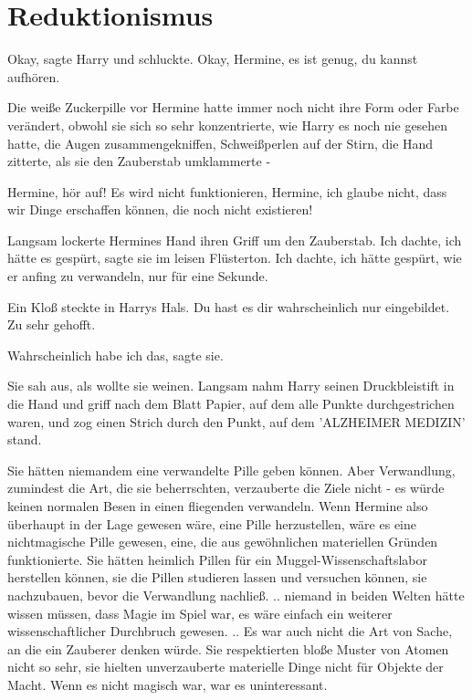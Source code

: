 \chapter{Reduktionismus}

\glqq Okay\grqq{}, sagte Harry und schluckte. \glqq Okay, Hermine, es ist genug,
du kannst aufhören.\grqq{}

Die weiße Zuckerpille vor Hermine hatte immer noch nicht ihre Form oder Farbe
verändert, obwohl sie sich so sehr konzentrierte, wie Harry es noch nie gesehen
hatte, die Augen zusammengekniffen, Schweißperlen auf der Stirn, die Hand
zitterte, als sie den Zauberstab umklammerte -

\glqq Hermine, hör auf! Es wird nicht funktionieren, Hermine, ich glaube nicht,
dass wir Dinge erschaffen können, die noch nicht existieren!\grqq{}

Langsam lockerte Hermines Hand ihren Griff um den Zauberstab. \glqq Ich dachte,
ich hätte es gespürt\grqq{}, sagte sie im leisen Flüsterton. \glqq Ich dachte,
ich hätte gespürt, wie er anfing zu verwandeln, nur für eine Sekunde.\grqq{}

Ein Kloß steckte in Harrys Hals. \glqq Du hast es dir wahrscheinlich nur
eingebildet. Zu sehr gehofft.\grqq{}

\glqq Wahrscheinlich habe ich das\grqq{}, sagte sie.

Sie sah aus, als wollte sie weinen. Langsam nahm Harry seinen Druckbleistift in
die Hand und griff nach dem Blatt Papier, auf dem alle Punkte durchgestrichen
waren, und zog einen Strich durch den Punkt, auf dem 'ALZHEIMER MEDIZIN' stand.

Sie hätten niemandem eine verwandelte Pille geben können. Aber Verwandlung,
zumindest die Art, die sie beherrschten, verzauberte die Ziele nicht - es würde
keinen normalen Besen in einen fliegenden verwandeln. Wenn Hermine also
überhaupt in der Lage gewesen wäre, eine Pille herzustellen, wäre es eine
nichtmagische Pille gewesen, eine, die aus gewöhnlichen materiellen Gründen
funktionierte. Sie hätten heimlich Pillen für ein Muggel-Wissenschaftslabor
herstellen können, sie die Pillen studieren lassen und versuchen können, sie
nachzubauen, bevor die Verwandlung nachließ. .. niemand in beiden Welten hätte
wissen müssen, dass Magie im Spiel war, es wäre einfach ein weiterer
wissenschaftlicher Durchbruch gewesen. .. Es war auch nicht die Art von Sache,
an die ein Zauberer denken würde. Sie respektierten bloße Muster von Atomen
nicht so sehr, sie hielten unverzauberte materielle Dinge nicht für Objekte der
Macht. Wenn es nicht magisch war, war es uninteressant.

